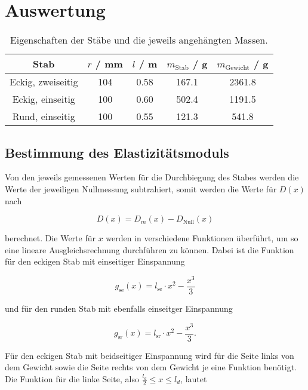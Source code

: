 \section{Auswertung}
\label{sec:Auswertung}

\begin{table}[!htp]
  \centering
  \caption{Eigenschaften der Stäbe und die jeweils angehängten Massen.}
  \label{tab:staebe}
  \begin{tabular}{c S[table-format=3.0] S[table-format=1.2] S[table-format=3.1] S[table-format=4.1]}
    \toprule
    {Stab} & {$r$ / mm} & {$l$ / m} & {$m_\text{Stab}$ / g} & {$m_\text{Gewicht}$ / g} \\
    \midrule
    Eckig, zweiseitig & 104 & 0.58 & 167.1 & 2361.8 \\
    Eckig, einseitig  & 100 & 0.60 & 502.4 & 1191.5 \\
    Rund, einseitig   & 100 & 0.55 & 121.3 &  541.8 \\
    \bottomrule
  \end{tabular}
\end{table}

\subsection{Bestimmung des Elastizitätsmoduls}

Von den jeweils gemessenen Werten für die Durchbiegung des Stabes werden die Werte der jeweiligen Nullmessung subtrahiert, somit werden die Werte für $D(x)$ nach

\begin{equation}
  D(x) = D_m(x) - D_\text{Null}(x)
\end{equation}

berechnet. Die Werte für $x$ werden in verschiedene Funktionen überführt, um so eine lineare Ausgleichsrechnung durchführen zu können.
Dabei ist die Funktion für den eckigen Stab mit einseitiger Einspannung

\begin{equation}
  g_\text{se}(x) = l_\text{se} \cdot x^2 - \frac{x^3}{3}
\end{equation}

und für den runden Stab mit ebenfalls einseitger Einspannung

\begin{equation}
  g_\text{sr}(x) = l_\text{sr} \cdot x^2 - \frac{x^3}{3} .
\end{equation}

Für den eckigen Stab mit beidseitiger Einspannung wird für die Seite links von dem Gewicht sowie die Seite rechts von dem Gewicht je eine Funktion benötigt.
Die Funktion für die linke Seite, also $\frac{l_d}{2} \leq x \leq l_d$, lautet

